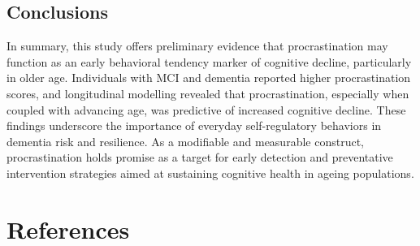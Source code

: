 \documentclass[
]{article}
\begin{document}
\subsection{Conclusions}\label{conclusions}

In summary, this study offers preliminary evidence that procrastination
may function as an early behavioral tendency marker of cognitive
decline, particularly in older age. Individuals with MCI and dementia
reported higher procrastination scores, and longitudinal modelling
revealed that procrastination, especially when coupled with advancing
age, was predictive of increased cognitive decline. These findings
underscore the importance of everyday self-regulatory behaviors in
dementia risk and resilience. As a modifiable and measurable construct,
procrastination holds promise as a target for early detection and
preventative intervention strategies aimed at sustaining cognitive
health in ageing populations.

\section*{References}\label{references}
\end{document}
